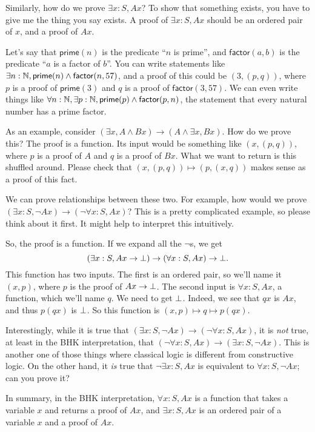 \documentclass[11pt,paper=letter]{scrartcl}
\newcommand{\sf}{\mathsf}
\renewcommand{\land}{\wedge}
\renewcommand{\lnot}{\neg}
\begin{document}
Similarly, how do we prove $\exists x: S, Ax$? To show that something exists, you have to give me the thing you say exists. A proof of $\exists x: S, Ax$ should be an ordered pair of $x$, and a proof of $Ax$.

Let's say that $\sf{prime}(n)$ is the predicate ``$n$ is prime'', and $\sf{factor}(a, b)$ is the predicate ``$a$ is a factor of $b$''. You can write statements like $\exists n: \NN, \sf{prime}(n) \land \sf{factor}(n, 57)$, and a proof of this could be $(3, (p, q))$, where $p$ is a proof of $\sf{prime}(3)$ and $q$ is a proof of $\sf{factor}(3, 57)$. We can even write things like $\forall n: \NN, \exists p: \NN, \sf{prime}(p) \land \sf{factor}(p, n)$, the statement that every natural number has a prime factor.

As an example, consider $(\exists x, A \land Bx) \to (A \land \exists x, Bx)$. How do we prove this? The proof is a function. Its input would be something like $(x, (p, q))$, where $p$ is a proof of $A$ and $q$ is a proof of $Bx$. What we want to return is this shuffled around. Please check that $(x, (p, q)) \mapsto (p, (x, q))$ makes sense as a proof of this fact.

We can prove relationships between these two. For example, how would we prove $(\exists x: S, \lnot Ax) \to (\lnot \forall x: S, Ax)$?  This is a pretty complicated example, so please think about it first. It might help to interpret this intuitively.

So, the proof is a function. If we expand all the $\lnot$s, we get \[
(\exists x: S, Ax \to \bot) \to (\forall x: S, Ax) \to \bot.\] This function has two inputs. The first is an ordered pair, so we'll name it $(x, p)$, where $p$ is the proof of $Ax \to \bot$. The second input is $\forall x: S, Ax$, a function, which we'll name $q$. We need to get $\bot$. Indeed, we see that $qx$ is $Ax$, and thus $p(qx)$ is $\bot$. So this function is $(x, p) \mapsto q \mapsto p(qx)$.

Interestingly, while it is true that $(\exists x: S, \lnot Ax) \to (\lnot \forall x:S, Ax)$, it is \emph{not} true, at least in the BHK interpretation, that $(\lnot \forall x:S, Ax) \to (\exists x: S, \lnot Ax)$. This is another one of those things where classical logic is different from constructive logic. On the other hand, it \emph{is} true that $\lnot \exists x: S, Ax$ is equivalent to $\forall x: S, \lnot Ax$; can you prove it?

In summary, in the BHK interpretation, $\forall x:S, Ax$ is a function that takes a variable $x$ and returns a proof of $Ax$, and $\exists x:S, Ax$ is an ordered pair of a variable $x$ and a proof of $Ax$.
\end{document}
